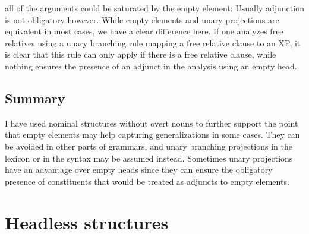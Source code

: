 \documentclass[output=paper
  ,nobabel
  ,draftmode
  ,uniformtopskip %
  ,colorlinks, citecolor=brown
]{langscibook}
\begin{document}
all of the arguments could be saturated by the empty element:
\z
Usually adjunction is not obligatory however. While empty elements and unary projections are
equivalent in most cases, we have a clear difference here. If one analyzes free relatives using a
unary branching rule mapping a free relative clause to an XP, it is clear that this rule can only
apply if there is a free relative clause, while nothing ensures the presence of an adjunct in the
analysis using an empty head.

\subsection{Summary}

\largerpage
I have used nominal structures without overt nouns to further support the point that empty elements may
help capturing generalizations in some cases. They can be avoided in other parts of grammars, and
unary branching projections in the lexicon or in the syntax may be assumed instead. Sometimes unary
projections have an advantage over empty heads since they can ensure the obligatory presence of
constituents that would be treated as adjuncts to empty elements.




\section{Headless structures}
\label{sec-kopflos}
\end{document}
